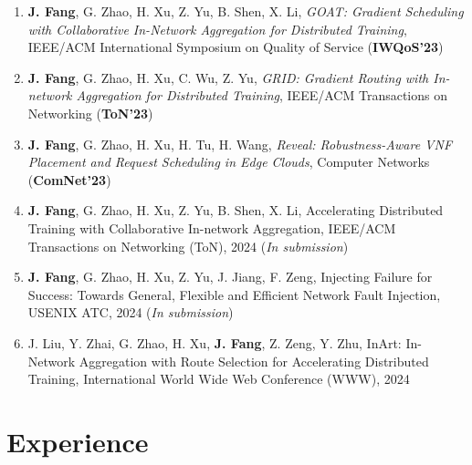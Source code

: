 \documentclass{resume}
\begin{document}
\begin{enumerate}
  \item \textbf{J. Fang}, G. Zhao, H. Xu, Z. Yu, B. Shen, X. Li, \textit{GOAT: Gradient Scheduling with Collaborative In-Network Aggregation for Distributed Training}, IEEE/ACM International Symposium on Quality of Service (\textbf{IWQoS'23})
  \item \textbf{J. Fang}, G. Zhao, H. Xu, C. Wu, Z. Yu, \textit{GRID: Gradient Routing with In-network Aggregation for Distributed Training}, IEEE/ACM Transactions on Networking (\textbf{ToN'23})
  \item \textbf{J. Fang}, G. Zhao, H. Xu, H. Tu, H. Wang, \textit{Reveal: Robustness-Aware VNF Placement and Request Scheduling in Edge Clouds}, Computer Networks (\textbf{ComNet'23})
  \item \textbf{J. Fang}, G. Zhao, H. Xu, Z. Yu, B. Shen, X. Li, Accelerating Distributed Training with Collaborative
  In-network Aggregation, IEEE/ACM Transactions on Networking (ToN), 2024 (\textit{In submission}) 
  \item \textbf{J. Fang}, G. Zhao, H. Xu, Z. Yu, J. Jiang, F. Zeng, Injecting Failure for Success: Towards General,
  Flexible and Efficient Network Fault Injection, USENIX ATC, 2024 (\textit{In submission})
  \item J. Liu, Y. Zhai, G. Zhao, H. Xu, \textbf{J. Fang}, Z. Zeng, Y. Zhu, InArt: In-Network Aggregation with Route
  Selection for Accelerating Distributed Training, International World Wide Web Conference (WWW), 2024
\end{enumerate}

\section{Experience}

\end{document}

